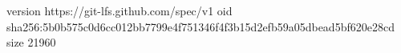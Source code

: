 version https://git-lfs.github.com/spec/v1
oid sha256:5b0b575c0d6cc012bb7799e4f751346f4f3b15d2efb59a05dbead5bf620e28cd
size 21960
